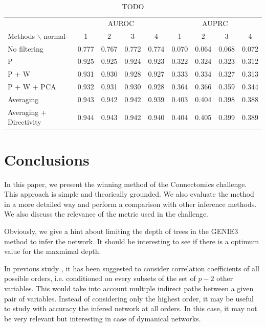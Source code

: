 \documentclass[wcp]{jmlr}
\begin{document}
\begin{table}[tbh]
\centering
\caption{TODO}
\begin{tabular}{@{}l *{8}{c}@{}}
  & \multicolumn{4}{c}{AUROC} & \multicolumn{4}{c}{AUPRC} \\
\cmidrule(r){2-5}\cmidrule(r){6-9}
Methods $\backslash$ normal- & 1 & 2 & 3 & 4 & 1 & 2 & 3 & 4 \\
\midrule
No  filtering       & 0.777 & 0.767 & 0.772 & 0.774 & 0.070 & 0.064 & 0.068 & 0.072\\
P                   & 0.925 & 0.925 & 0.924 & 0.923 & 0.322 & 0.324 & 0.323 & 0.312\\
P + W               & 0.931 & 0.930 & 0.928 & 0.927 & 0.333 & 0.334 & 0.327 & 0.313\\
P + W + PCA         & 0.932 & 0.931 & 0.930 & 0.928 & 0.364 & 0.366 & 0.359 & 0.344\\
Averaging           & 0.943 & 0.942 & 0.942 & 0.939 & 0.403 & 0.404 & 0.398 & 0.388\\
Averaging + Directivity & 0.944 & 0.943 & 0.942 & 0.940 & 0.404 & 0.405 & 0.399 & 0.389\\
\end{tabular}
\end{table}





\section{Conclusions} \label{sec:conclusion}






In this paper, we present the winning method of the Connectomics challenge.
This approach is simple and theorically grounded. We also evaluate the method
in a more detailed way and perform a comparison with other inference methods.
We also discuss the relevance of the metric used in the challenge.

Obviously, we give a hint about limiting the depth of trees in the GENIE3
method to infer the network. It should be interesting to see if there is a
optimum value for the maxmimal depth.

In previous study \citep{shipley2002cause}, it has been suggested to
consider correlation coefficients of all possible orders,
i.e. conditioned on every subsets of the set of $p-2$ other variables. This
would take into account multiple indirect paths between a given pair of
variables. Instead of considering only the highest order, it may be useful to
study with accuracy the infered network at all orders. In this case, it may not
be very relevant but interesting in case of dymanical networks.
\end{document}
